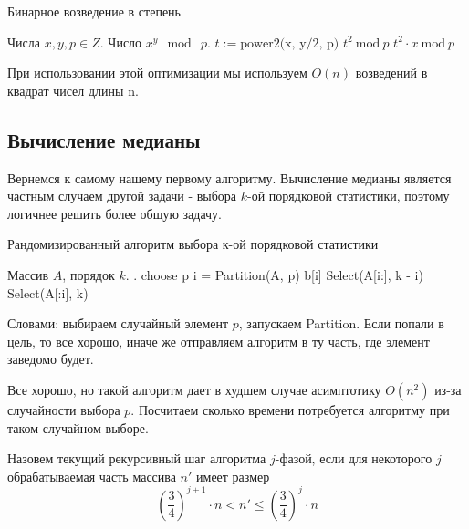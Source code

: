 \documentclass[../book.tex]{subfiles}
\begin{document}
		\begin{algorithm}[H]
			\caption{Бинарное возведение в степень}
			\begin{algorithmic}[1]
				\Require Числа $x, y, p\in Z$.
				\Ensure Число $x^y \mod \ p$.
						\State {}
					\Else
						\State $t := \text{power2(x, y/2, p)}$
							\State \Return $t^2 \ \text{mod} \ p$
						\Else
							\State \Return $t^2 \cdot x \ \text{mod} \ p$
						\EndIf
					\EndIf
				\EndFunction
			\end{algorithmic}
		\end{algorithm}
		
		\begin{time}
			При использовании этой оптимизации мы используем $O(n)$ возведений в квадрат чисел длины n.
		\end{time}
		
		\subsection{Вычисление медианы}
		
		Вернемся к самому нашему первому алгоритму. Вычисление медианы является частным случаем другой задачи - выбора $k$-ой порядковой статистики, поэтому логичнее решить более общую задачу.
		
		\begin{algorithm}[H]
			\caption{Рандомизированный алгоритм выбора к-ой порядковой статистики}
			\begin{algorithmic}[1]
				\Require Массив $A$, порядок $k$.
				\Ensure .
					\State choose p
					\State i = Partition(A, p)
						\State \Return b[i]
						\State \Return Select(A[i:], k - i)
					\Else
						\State \Return Select(A[:i], k)
					\EndIf
				\EndFunction
			\end{algorithmic}
		\end{algorithm}
		
		Словами: выбираем случайный элемент $p$, запускаем Partition. Если попали в цель, то все хорошо, иначе же отправляем алгоритм в ту часть, где элемент заведомо будет.
		
		Все хорошо, но такой алгоритм дает в худшем случае асимптотику $O(n^2)$ из-за случайности выбора $p$. Посчитаем сколько времени потребуется алгоритму при таком случайном выборе.
		
		\begin{definition}
			Назовем текущий рекурсивный шаг алгоритма $j$-фазой, если для некоторого $j$ обрабатываемая часть массива $n'$ имеет размер
			\[
			\left(\frac{3}{4}\right)^{j + 1} \cdot n < n' \leqslant \left(\frac{3}{4}\right)^{j} \cdot n
			\]
		\end{definition}
		
\end{document}
